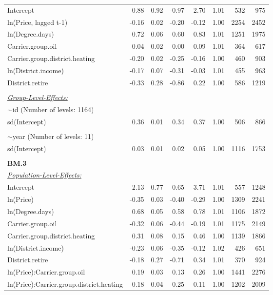 \documentclass[12pt,twoside]{reedthesis}
\begin{document}
\begin{longtable}[c]{lrrrrrrr}
Intercept & 0.88 & 0.92 & -0.97 & 2.70 & 1.01 & 532 & 975 \\
ln(Price, lagged t-1) & -0.16 & 0.02 & -0.20 & -0.12 & 1.00 & 2254 & 2452 \\
ln(Degree.days) & 0.72 & 0.06 & 0.60 & 0.83 & 1.01 & 1251 & 1975 \\
Carrier.group.oil & 0.04 & 0.02 & 0.00 & 0.09 & 1.01 & 364 & 617 \\
Carrier.group.district.heating & -0.20 & 0.02 & -0.25 & -0.16 & 1.00 & 460 & 903 \\
ln(District.income) & -0.17 & 0.07 & -0.31 & -0.03 & 1.01 & 455 & 963 \\
District.retire & -0.33 & 0.28 & -0.86 & 0.22 & 1.00 & 586 & 1219 \\
 &  &  &  &  &  &  &  \\
{\ul \textit{Group-Level-Effects:}} &  &  &  &  &  &  &  \\
$\sim$id (Number of levels: 1164) &  &  &  &  &  &  &  \\
sd(Intercept) & 0.36 & 0.01 & 0.34 & 0.37 & 1.00 & 506 & 866 \\
 &  &  &  &  &  &  &  \\
$\sim$year (Number of levels: 11) &  &  &  &  &  &  &  \\
sd(Intercept) & 0.03 & 0.01 & 0.02 & 0.05 & 1.00 & 1116 & 1753 \\ \hline
 &  &  &  &  &  &  &  \\ \hline
\textbf{BM.3} &  &  &  &  &  &  &  \\
{\ul \textit{Population-Level-Effects:}} &  &  &  &  &  &  &  \\
Intercept & 2.13 & 0.77 & 0.65 & 3.71 & 1.01 & 557 & 1248 \\
ln(Price) & -0.35 & 0.03 & -0.40 & -0.29 & 1.00 & 1309 & 2241 \\
ln(Degree.days) & 0.68 & 0.05 & 0.58 & 0.78 & 1.01 & 1106 & 1872 \\
Carrier.group.oil & -0.32 & 0.06 & -0.44 & -0.19 & 1.01 & 1175 & 2149 \\
Carrier.group.district.heating & 0.31 & 0.08 & 0.15 & 0.46 & 1.00 & 1139 & 1866 \\
ln(District.income) & -0.23 & 0.06 & -0.35 & -0.12 & 1.02 & 426 & 651 \\
District.retire & -0.18 & 0.27 & -0.71 & 0.34 & 1.01 & 370 & 924 \\
ln(Price):Carrier.group.oil & 0.19 & 0.03 & 0.13 & 0.26 & 1.00 & 1441 & 2276 \\
ln(Price):Carrier.group.district.heating & -0.18 & 0.04 & -0.25 & -0.11 & 1.00 & 1202 & 2009 \\

\end{longtable}
\end{document}
